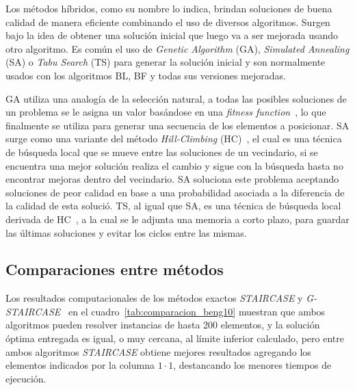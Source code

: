 \documentclass[letter, 10pt]{article}
\begin{document}
Los m\'etodos h\'ibridos, como su nombre lo indica, brindan soluciones de buena calidad de manera eficiente combinando el uso de diversos algoritmos. Surgen bajo la idea de obtener una soluci\'on inicial que luego va a ser mejorada usando otro algoritmo. Es com\'un el uso de \emph{Genetic Algorithm} (GA), \emph{Simulated Annealing} (SA) o \emph{Tabu Search} (TS) para generar la soluci\'on inicial y son normalmente usados con los algoritmos BL, BF y todas sus versiones mejoradas.

GA utiliza una analog\'ia de la selecci\'on natural, a todas las posibles soluciones de un problema se le asigna un valor bas\'andose en una \emph{fitness function}~\cite{thomas2013hybrid}, lo que finalmente se utiliza para generar una secuencia de los elementos a posicionar. SA surge como una variante del m\'etodo \emph{Hill-Climbing} (HC)~\cite{hopper2001empirical}, el cual es una t\'ecnica de b\'usqueda local que se mueve entre las soluciones de un vecindario, si se encuentra una mejor soluci\'on realiza el cambio y sigue con la b\'usqueda hasta no encontrar mejoras dentro del vecindario. SA soluciona este problema aceptando soluciones de peor calidad en base a una probabilidad asociada a la diferencia de la calidad de esta soluci\'o. TS, al igual que SA, es una t\'ecnica de b\'usqueda local derivada de HC~\cite{wei2011skyline}, a la cual se le adjunta una memoria a corto plazo, para guardar las \'ultimas soluciones y evitar los ciclos entre las mismas.


\subsection{Comparaciones entre m\'etodos}

Los resultados computacionales de los m\'etodos exactos \emph{STAIRCASE} y \emph{G-STAIRCASE}~\cite{kenmochi2009exact} en el cuadro~\ref{tab:comparacion_beng10} muestran que ambos algoritmos pueden resolver instancias de hasta 200 elementos, y la soluci\'on \'optima entregada es igual, o muy cercana, al l\'imite inferior calculado, pero entre ambos algoritmos \emph{STAIRCASE} obtiene mejores resultados agregando los elementos indicados por la columna $1 \cdot 1$, destancando los menores tiempos de ejecuci\'on.
\end{document}
